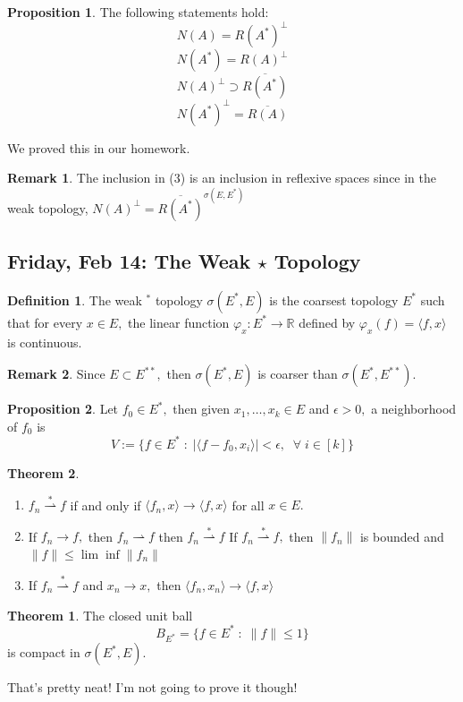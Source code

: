 \documentclass[10pt, oneside]{article}
\newcommand{\bbR}{\mathbb{R}}
\theoremstyle{definition}
\newtheorem{thm}{Theorem}
\newtheorem{defn}{Definition}
\newtheorem{prop}{Proposition}
\newtheorem{rem}{Remark}
\begin{document}
 \begin{prop}
     The following statements hold:
     \[N(A) = R(A^*)^\perp\]
     \[N(A^*) = R(A)^\perp\]
     \[N(A)^\perp \supset \overline{R(A^*)}\]
     \[N(A^*)^\perp = \overline{R(A)}\]
 \end{prop}
 We proved this in our homework.
 \begin{rem}
     The inclusion in (3) is an inclusion in reflexive spaces since in the weak topology, $N(A)^\perp = \overline{R(A^*)}^{\sigma(E, E^*)}$
 \end{rem}

 \newpage
 \subsection{Friday, Feb 14: The Weak $\star$ Topology}
\begin{defn}
    The weak $^*$ topology $\sigma(E^*, E)$ is the coarsest topology $E^*$  such that for every $x\in E,$ the linear function $\varphi_x: E^*\to \bbR$ defined by $\varphi_x(f)= \langle f, x\rangle$ is continuous. 
\end{defn}
\begin{rem}
    Since $E\subset E^{**},$ then $\sigma(E^*, E)$ is coarser than $\sigma(E^*, E^{**}).$
\end{rem}
\begin{prop}
    Let $f_0 \in E^*,$ then given ${x_1, \dots, x_k}\in E$ and $\epsilon >0,$ a neighborhood of $f_0$ is 
    \[V:= \{f\in E^* \; : \; |\langle f - f_0, x_i \rangle|< \epsilon, \; \; \forall \;i\in [k]\}\]
\end{prop}

\begin{thm}
\begin{enumerate}
    \item $f_n\stackrel{\ast}{\rightharpoonup} f$ if and only if $\langle f_n, x\rangle \to \langle f, x\rangle$ for all $x\in E.$
    \item If $f_n \to f,$ then $f_n\rightharpoonup f$ then $f_n\stackrel{\ast}{\rightharpoonup} f$
    \itme If $f_n\stackrel{\ast}{\rightharpoonup} f,$ then $\|f_n\|$ is bounded and $\|f\|\leq \lim\inf \|f_n\|$
    \item If $f_n\stackrel{\ast}{\rightharpoonup} f$ and $x_n \to x,$ then $\langle f_n, x_n\rangle \to \langle f, x\rangle$
\end{enumerate}

\begin{thm}
    The closed unit ball 
    \[B_{E^*} = \{f \in E^* \; : \; \|f\|\leq 1\}\] is compact in $\sigma(E^*, E).$
\end{thm}
That's pretty neat! I'm not going to prove it though!
\end{thm}
\end{document}
